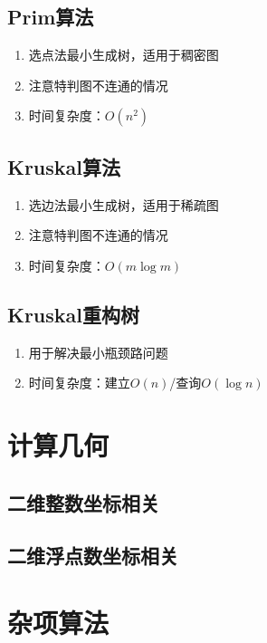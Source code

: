 \documentclass[twocolumn,a4,8pt]{article}  %
\begin{document}
		\subsection{Prim算法}
			\noindent\begin{enumerate}
				\item 选点法最小生成树，适用于稠密图
				\item 注意特判图不连通的情况
				\item 时间复杂度：$O(n^2)$
			\end{enumerate}
	 	 	
	 	 	
		\subsection{Kruskal算法}
			\noindent\begin{enumerate}
				\item 选边法最小生成树，适用于稀疏图
				\item 注意特判图不连通的情况
				\item 时间复杂度：$O(m\log m)$
			\end{enumerate}
	 	 	
	 	 	
		\subsection{Kruskal重构树}
			\noindent\begin{enumerate}
				\item 用于解决最小瓶颈路问题
				\item 时间复杂度：建立$O(n)$/查询$O(\log n)$
			\end{enumerate}
	 	 	
	 	 	
	\section{计算几何}
		\subsection{二维整数坐标相关}
	 	 	
	 	 	
		\subsection{二维浮点数坐标相关}
	 	 	
	
	\section{杂项算法}
\end{document}
